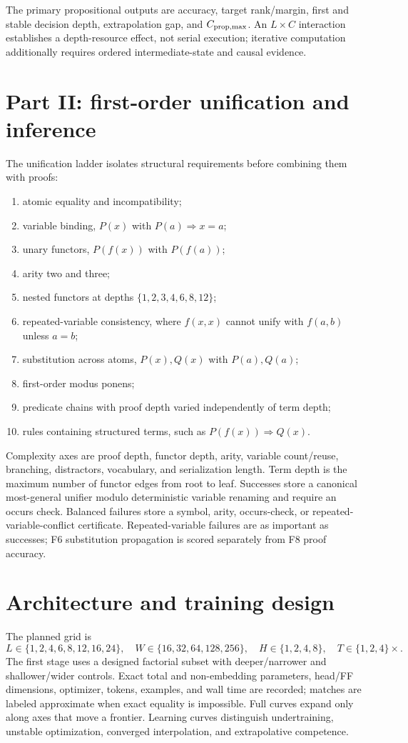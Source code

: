 \documentclass[10pt]{article}
\begin{document}
The primary propositional outputs are accuracy, target rank/margin, first and stable decision depth, extrapolation gap, and $C_{\rm prop,max}$. An $L\times C$ interaction establishes a depth-resource effect, not serial execution; iterative computation additionally requires ordered intermediate-state and causal evidence.

\section{Part II: first-order unification and inference}
The unification ladder isolates structural requirements before combining them with proofs:
\begin{enumerate}[label=F\arabic*.,start=0]
\item atomic equality and incompatibility;
\item variable binding, $P(x)$ with $P(a)\Rightarrow x=a$;
\item unary functors, $P(f(x))$ with $P(f(a))$;
\item arity two and three;
\item nested functors at depths $\{1,2,3,4,6,8,12\}$;
\item repeated-variable consistency, where $f(x,x)$ cannot unify with $f(a,b)$ unless $a=b$;
\item substitution across atoms, $P(x),Q(x)$ with $P(a),Q(a)$;
\item first-order modus ponens;
\item predicate chains with proof depth varied independently of term depth;
\item rules containing structured terms, such as $P(f(x))\Rightarrow Q(x)$.
\end{enumerate}

Complexity axes are proof depth, functor depth, arity, variable count/reuse, branching, distractors, vocabulary, and serialization length. Term depth is the maximum number of functor edges from root to leaf. Successes store a canonical most-general unifier modulo deterministic variable renaming and require an occurs check. Balanced failures store a symbol, arity, occurs-check, or repeated-variable-conflict certificate. Repeated-variable failures are as important as successes; F6 substitution propagation is scored separately from F8 proof accuracy.

\section{Architecture and training design}
The planned grid is
\[
L\in\{1,2,4,6,8,12,16,24\},\quad
W\in\{16,32,64,128,256\},\quad
H\in\{1,2,4,8\},\quad T\in\{1,2,4\}\times.
\]
The first stage uses a designed factorial subset with deeper/narrower and shallower/wider controls. Exact total and non-embedding parameters, head/FF dimensions, optimizer, tokens, examples, and wall time are recorded; matches are labeled approximate when exact equality is impossible. Full curves expand only along axes that move a frontier. Learning curves distinguish undertraining, unstable optimization, converged interpolation, and extrapolative competence.
\end{document}
